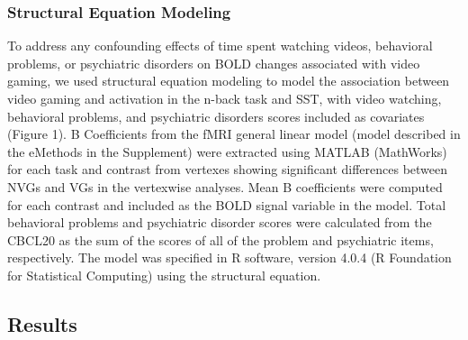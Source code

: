 \documentclass{article}
\begin{document}
\hypertarget{structural-equation-modeling}{%
\subsubsection{Structural Equation
Modeling}\label{structural-equation-modeling}}

To address any confounding effects of time spent watching videos,
behavioral problems, or psychiatric disorders on BOLD changes associated
with video gaming, we used structural equation modeling to model the
association between video gaming and activation in the n-back task and
SST, with video watching, behavioral problems, and psychiatric disorders
scores included as covariates (Figure 1). B Coefficients from the fMRI
general linear model (model described in the eMethods in the Supplement)
were extracted using MATLAB (MathWorks) for each task and contrast from
vertexes showing significant differences between NVGs and VGs in the
vertexwise analyses. Mean B coefficients were computed for each contrast
and included as the BOLD signal variable in the model. Total behavioral
problems and psychiatric disorder scores were calculated from the CBCL20
as the sum of the scores of all of the problem and psychiatric items,
respectively. The model was specified in R software, version 4.0.4 (R
Foundation for Statistical Computing) using the structural equation.

\hypertarget{results}{%
\subsection{Results}\label{results}}
\end{document}
